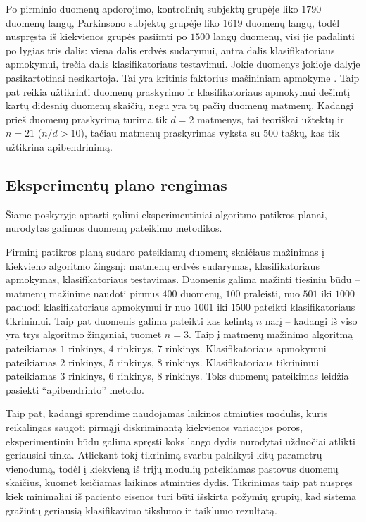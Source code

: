 \documentclass[]{vgtuef}
\begin{document}
Po pirminio duomenų apdorojimo, kontrolinių subjektų grupėje liko $1790$ duomenų langų, Parkinsono subjektų grupėje liko $1619$ duomenų langų, todėl nuspręsta iš kiekvienos grupės pasiimti po $1500$ langų duomenų, visi jie padalinti po lygias tris dalis: viena dalis erdvės sudarymui, antra dalis klasifikatoriaus apmokymui, trečia dalis klasifikatoriaus testavimui. Jokie duomenys jokioje dalyje pasikartotinai nesikartoja. Tai yra kritinis faktorius mašininiam apmokyme \cite{824819}. Taip pat reikia užtikrinti duomenų praskyrimo ir klasifikatoriaus apmokymui dešimtį kartų didesnių duomenų skaičių, negu yra tų pačių duomenų matmenų. Kadangi prieš duomenų praskyrimą turima tik $d=2$ matmenys, tai teoriškai užtektų ir $n=21$ ($n/d > 10$), tačiau matmenų praskyrimas vyksta su $500$ taškų, kas tik užtikrina apibendrinimą. 

\subsection{Eksperimentų plano rengimas}

Šiame poskyryje aptarti galimi eksperimentiniai algoritmo patikros planai, nurodytas galimos duomenų pateikimo metodikos.

Pirminį patikros planą sudaro pateikiamų duomenų skaičiaus mažinimas į kiekvieno algoritmo žingsnį: matmenų erdvės sudarymas, klasifikatoriaus apmokymas, klasifikatoriaus testavimas. Duomenis galima mažinti tiesiniu būdu -- matmenų mažinime naudoti pirmus $400$ duomenų, $100$ praleisti, nuo $501$ iki $1000$ paduodi klasifikatoriaus apmokymui ir nuo $1001$ iki $1500$ pateikti klasifikatoriaus tikrinimui. Taip pat duomenis galima pateikti kas kelintą $n$ narį -- kadangi iš viso yra trys algoritmo žingsniai, tuomet $n=3$. Taip į matmenų mažinimo algoritmą pateikiamas $1$ rinkinys, $4$ rinkinys, $7$ rinkinys. Klasifikatoriaus apmokymui pateikiamas $2$ rinkinys, $5$ rinkinys, $8$ rinkinys. Klasifikatoriaus tikrinimui pateikiamas $3$ rinkinys, $6$ rinkinys, $8$ rinkinys. Toks duomenų pateikimas leidžia pasiekti ``apibendrinto'' metodo. 

Taip pat, kadangi sprendime naudojamas laikinos atminties modulis, kuris reikalingas saugoti pirmąjį diskriminantą kiekvienos variacijos poros, eksperimentiniu būdu galima spręsti koks lango dydis nurodytai užduočiai atlikti geriausiai tinka. Atliekant tokį tikrinimą svarbu palaikyti kitų parametrų vienodumą, todėl į kiekvieną iš trijų modulių pateikiamas pastovus duomenų skaičius, kuomet keičiamas laikinos atminties dydis. Tikrinimas taip pat nuspręs kiek minimaliai iš paciento eisenos turi būti išskirta požymių grupių, kad sistema gražintų geriausią klasifikavimo tikslumo ir taiklumo rezultatą.
\end{document}
